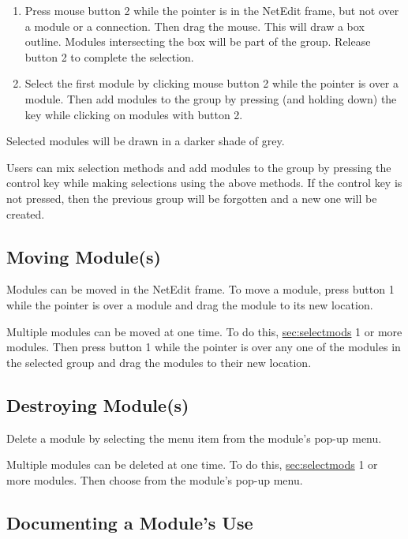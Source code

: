 \begin{enumerate}
\item Press mouse button 2 while the pointer is in the NetEdit frame, but not over
a module or a connection.  Then drag the mouse.  This will draw a box
outline.  Modules intersecting the box will be part of the group.  Release
button 2 to complete the selection.
\item Select the first module by clicking mouse button 2 while the pointer is
over a module.  Then add modules to the group by pressing (and holding
down) the  key while clicking on modules with button 2.
\end{enumerate}

Selected modules will be drawn in a darker shade of grey.

Users can mix selection methods and  add modules to the group by
pressing the control key while making selections using the above methods.
If  the control key is not pressed, then the previous group will be
forgotten and a new one will be created.

\subsection{Moving Module(s)}
\label{sec:movemod}

Modules can be moved in the NetEdit frame.  To move a module,
press button 1 while the pointer is over a module and drag the module to
its new location.

Multiple modules can be moved at one time.  To do this,
\hyperref{select}{select (see Section~}{)}{sec:selectmods} 1 or more
modules. Then press button 1 while the pointer is over any one of the
modules in the selected group and drag the modules to their new location.


\subsection{Destroying Module(s)}
\label{sec:destroymod}

Delete a module by selecting the  menu item from the
module's pop-up menu.

Multiple modules can be deleted at one time.  To do this,
\hyperref{select}{select (see Section~}{)}{sec:selectmods} 1 or more
modules. Then choose   from the module's pop-up menu.
 


\subsection{Documenting a Module's Use}
\label{sec:docmodule}

